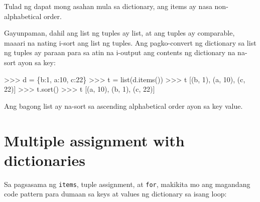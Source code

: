 \documentclass[10pt,]{book}
\newenvironment{Shaded}{}{}
\newcommand{\BuiltInTok}[1]{\textcolor[rgb]{0.00,0.50,0.00}{#1}}
\newcommand{\DecValTok}[1]{\textcolor[rgb]{0.25,0.63,0.44}{#1}}
\newcommand{\NormalTok}[1]{#1}
\newcommand{\OperatorTok}[1]{\textcolor[rgb]{0.40,0.40,0.40}{#1}}
\newcommand{\StringTok}[1]{\textcolor[rgb]{0.25,0.44,0.63}{#1}}
\begin{document}
Tulad ng dapat mong asahan mula sa dictionary, ang items ay nasa
non-alphabetical order.

Gayunpaman, dahil ang list ng tuples ay list, at ang tuples ay
comparable, maaari na nating i-sort ang list ng tuples. Ang
pagko-convert ng dictionary sa list ng tuples ay paraan para sa atin na
i-output ang contents ng dictionary na na-sort ayon sa key:

\begin{Shaded}
\begin{Highlighting}[]
\OperatorTok{\textgreater{}\textgreater{}\textgreater{}}\NormalTok{ d }\OperatorTok{=}\NormalTok{ \{}\StringTok{\textquotesingle{}b\textquotesingle{}}\NormalTok{:}\DecValTok{1}\NormalTok{, }\StringTok{\textquotesingle{}a\textquotesingle{}}\NormalTok{:}\DecValTok{10}\NormalTok{, }\StringTok{\textquotesingle{}c\textquotesingle{}}\NormalTok{:}\DecValTok{22}\NormalTok{\}}
\OperatorTok{\textgreater{}\textgreater{}\textgreater{}}\NormalTok{ t }\OperatorTok{=} \BuiltInTok{list}\NormalTok{(d.items())}
\OperatorTok{\textgreater{}\textgreater{}\textgreater{}}\NormalTok{ t}
\NormalTok{[(}\StringTok{\textquotesingle{}b\textquotesingle{}}\NormalTok{, }\DecValTok{1}\NormalTok{), (}\StringTok{\textquotesingle{}a\textquotesingle{}}\NormalTok{, }\DecValTok{10}\NormalTok{), (}\StringTok{\textquotesingle{}c\textquotesingle{}}\NormalTok{, }\DecValTok{22}\NormalTok{)]}
\OperatorTok{\textgreater{}\textgreater{}\textgreater{}}\NormalTok{ t.sort()}
\OperatorTok{\textgreater{}\textgreater{}\textgreater{}}\NormalTok{ t}
\NormalTok{[(}\StringTok{\textquotesingle{}a\textquotesingle{}}\NormalTok{, }\DecValTok{10}\NormalTok{), (}\StringTok{\textquotesingle{}b\textquotesingle{}}\NormalTok{, }\DecValTok{1}\NormalTok{), (}\StringTok{\textquotesingle{}c\textquotesingle{}}\NormalTok{, }\DecValTok{22}\NormalTok{)]}
\end{Highlighting}
\end{Shaded}

Ang bagong list ay na-sort sa ascending alphabetical order ayon sa key
value.

\section{Multiple assignment with
dictionaries}\label{multiple-assignment-with-dictionaries}

 

Sa pagsasama ng \texttt{items}, tuple assignment, at \texttt{for},
makikita mo ang magandang code pattern para dumaan sa keys at values ng
dictionary sa isang loop:
\end{document}
